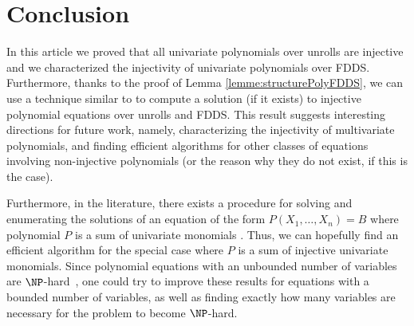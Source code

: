 \section{Conclusion}

In this article we proved that all univariate polynomials over unrolls are injective and we characterized the injectivity of univariate polynomials over FDDS. 
Furthermore, thanks to the proof of Lemma \ref{lemme:structurePolyFDDS}, we can use a technique similar to \cite{kroot} to compute a solution (if it exists) to injective polynomial equations over unrolls and FDDS. 
This result suggests interesting directions for future work,
namely, characterizing the injectivity of multivariate polynomials, and finding efficient algorithms for other classes of equations involving non-injective polynomials (or the reason why they do not exist, if this is the case).

Furthermore, in the literature, there exists a procedure for solving and enumerating the solutions of an equation of the form $P(X_1, \ldots, X_n) = B$ where polynomial $P$ is a sum of univariate monomials \cite{dennunzio2023dds_journal}.
Thus, we can hopefully find an efficient algorithm for the special case where $P$ is a sum of injective univariate monomials. Since polynomial equations with an unbounded number of variables are $\NP$-hard~\cite{NPhard}, one could try to improve these results for equations with a bounded number of variables, as well as finding exactly how many variables are necessary for the problem to become $\NP$-hard.


